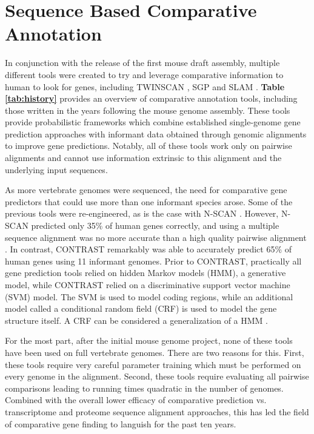 \documentclass[fleqn,10pt]{wlscirep}
\begin{document}
\section*{Sequence Based Comparative Annotation}

In conjunction with the release of the first mouse draft assembly\cite{waterston2002initial}, multiple different tools were created to try and leverage comparative information to human to look for genes, including TWINSCAN \cite{flicek2003leveraging}, SGP \cite{wiehe2001sgp} and SLAM \cite{alexandersson2003slam}. \textbf{Table \ref{tab:history}} provides an overview of comparative annotation tools, including those written in the years following the mouse genome assembly. These tools provide probabilistic frameworks which combine established single-genome gene prediction approaches \cite{yeh2001computational,gelfand1996gene} with informant data obtained through genomic alignments to improve gene predictions. Notably, all of these tools work only on pairwise alignments and cannot use information extrinsic to this alignment and the underlying input sequences.

As more vertebrate genomes were sequenced, the need for comparative gene predictors that could use more than one informant species arose. Some of the previous tools were re-engineered, as is the case with N-SCAN \cite{gross2006using,van2007using}. However, N-SCAN predicted only 35\% of human genes correctly, and using a multiple sequence alignment was no more accurate than a high quality pairwise alignment \cite{flicek2007gene}. In contrast, CONTRAST \cite{gross2007contrast} remarkably was able to accurately predict 65\% of human genes using 11 informant genomes. Prior to CONTRAST, practically all gene prediction tools relied on hidden Markov models (HMM), a generative model, while CONTRAST relied on a discriminative support vector machine (SVM) model. The SVM is used to model coding regions, while an additional model called a conditional random field (CRF) is used to model the gene structure itself. A CRF can be considered a generalization of a HMM \cite{lafferty2001conditional}.

For the most part, after the initial mouse genome project, none of these tools have been used on full vertebrate genomes. There are two reasons for this. First, these tools require very careful parameter training which must be performed on every genome in the alignment. Second, these tools require evaluating all pairwise comparisons leading to running times quadratic in the number of genomes. Combined with the overall lower efficacy of comparative prediction vs. transcriptome and proteome sequence alignment approaches, this has led the field of comparative gene finding to languish for the past ten years.
\end{document}
